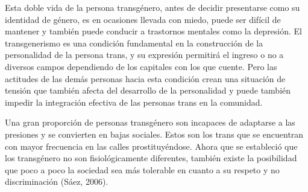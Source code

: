 Esta doble vida de la persona transgénero, antes de decidir presentarse como su
identidad de género, es en ocasiones llevada con miedo, puede ser difícil de
mantener y también puede conducir a trastornos mentales como la depresión. El
transgenerismo es una condición fundamental en la construcción de la
personalidad de la persona trans, y su expresión permitirá el ingreso o no a
diversos campos dependiendo de los capitales con los que cuente. Pero las
actitudes de las demás personas hacia esta condición crean una situación de
tensión que también afecta del desarrollo de la personalidad y puede también
impedir la integración efectiva de las personas trans en la comunidad.

Una gran proporción de personas transgénero son incapaces de adaptarse a las
presiones y se convierten en bajas sociales. Estos son los trans que se
encuentran con mayor frecuencia en las calles prostituyéndose. Ahora que se
estableció que los transgénero no son fisiológicamente diferentes, también
existe la posibilidad que poco a poco la sociedad sea más tolerable en cuanto a
su respeto y no discriminación (Sáez, 2006).
